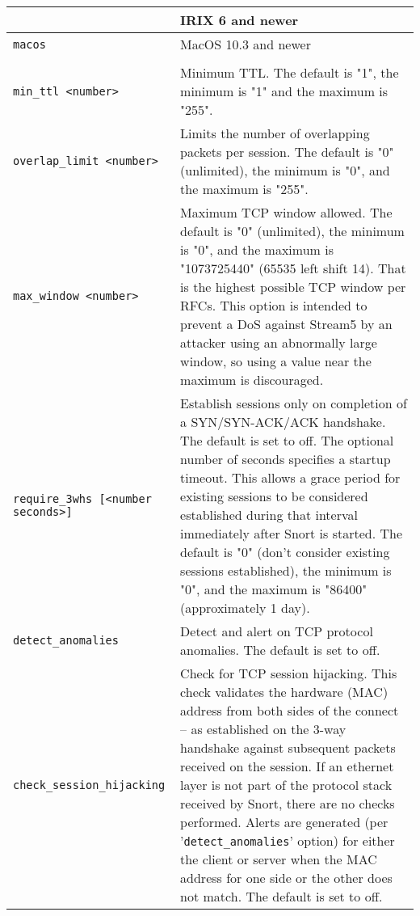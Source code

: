\documentclass[english]{report}
\begin{document}
\begin{longtable}[h]{| p{2in} | p{4in} |}
\begin{tabular}{| l | p{2.5in} |}
\hline
\texttt{irix} & IRIX 6 and newer\\

\hline
\texttt{macos} & MacOS 10.3 and newer\\

\hline
\end{tabular}\\

\hline
\texttt{min\_ttl <number>} &

Minimum TTL.  The default is "1", the minimum is "1" and the maximum is "255".
\\

\hline
\texttt{overlap\_limit <number>} &

Limits the number of overlapping packets per session.  The default is "0"
(unlimited), the minimum is "0", and the maximum is "255".\\

\hline
\texttt{max\_window <number>} &

Maximum TCP window allowed.  The default is "0" (unlimited), the minimum is
"0", and the maximum is "1073725440" (65535 left shift 14).  That is the
highest possible TCP window per RFCs.  This option is intended to prevent a DoS
against Stream5 by an attacker using an abnormally large window, so using a
value near the maximum is discouraged.\\

\hline
\texttt{require\_3whs [<number seconds>]} &

Establish sessions only on completion of a SYN/SYN-ACK/ACK handshake.  The
default is set to off.  The optional number of seconds specifies a startup
timeout.  This allows a grace period for existing sessions to be considered
established during that interval immediately after Snort is started.  The
default is "0" (don't consider existing sessions established), the minimum is
"0", and the maximum is "86400" (approximately 1 day).\\

\hline
\texttt{detect\_anomalies} &

Detect and alert on TCP protocol anomalies.  The default is set to off.\\

\hline
\texttt{check\_session\_hijacking} &

Check for TCP session hijacking.  This check validates the hardware (MAC)
address from both sides of the connect -- as established on the 3-way handshake
against subsequent packets received on the session.  If an ethernet layer is
not part of the protocol stack received by Snort, there are no checks
performed.  Alerts are generated (per '\texttt{detect\_anomalies}' option) for
either the client or server when the MAC address for one side or the other does
not match.  The default is set to off.\\


\end{longtable}
\end{document}
